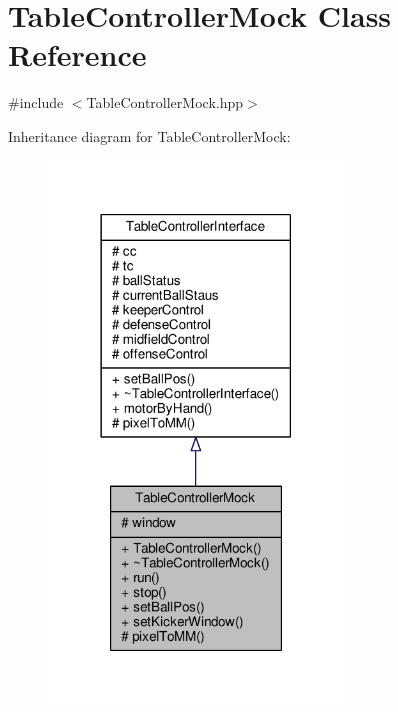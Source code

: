 \hypertarget{class_table_controller_mock}{}\section{Table\+Controller\+Mock Class Reference}
\label{class_table_controller_mock}


{\ttfamily \#include $<$Table\+Controller\+Mock.\+hpp$>$}



Inheritance diagram for Table\+Controller\+Mock\+:\nopagebreak
\begin{figure}[H]
\begin{center}
\leavevmode
\includegraphics[width=222pt]{class_table_controller_mock__inherit__graph}
\end{center}
\end{figure}


